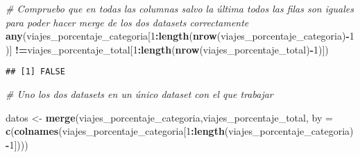 \documentclass[notspecified,article,submit,moreauthors,pdftex]{Definitions/mdpi}
\newenvironment{Shaded}{\begin{snugshade}}{\end{snugshade}}
\newcommand{\AttributeTok}[1]{\textcolor[rgb]{0.13,0.29,0.53}{#1}}
\newcommand{\CommentTok}[1]{\textcolor[rgb]{0.56,0.35,0.01}{\textit{#1}}}
\newcommand{\DecValTok}[1]{\textcolor[rgb]{0.00,0.00,0.81}{#1}}
\newcommand{\FunctionTok}[1]{\textcolor[rgb]{0.13,0.29,0.53}{\textbf{#1}}}
\newcommand{\NormalTok}[1]{#1}
\newcommand{\OtherTok}[1]{\textcolor[rgb]{0.56,0.35,0.01}{#1}}
\newcommand{\SpecialCharTok}[1]{\textcolor[rgb]{0.81,0.36,0.00}{\textbf{#1}}}
\begin{document}
\begin{Shaded}
\begin{Highlighting}[]
\CommentTok{\# Compruebo que en todas las columnas salvo la última todos las filas son iguales para poder hacer merge de los dos datasets correctamente}
\FunctionTok{any}\NormalTok{(viajes\_porcentaje\_categoria[}\DecValTok{1}\SpecialCharTok{:}\FunctionTok{length}\NormalTok{(}\FunctionTok{nrow}\NormalTok{(viajes\_porcentaje\_categoria)}\SpecialCharTok{{-}}\DecValTok{1}\NormalTok{)] }\SpecialCharTok{!=}\NormalTok{viajes\_porcentaje\_total[}\DecValTok{1}\SpecialCharTok{:}\FunctionTok{length}\NormalTok{(}\FunctionTok{nrow}\NormalTok{(viajes\_porcentaje\_total)}\SpecialCharTok{{-}}\DecValTok{1}\NormalTok{)])}
\end{Highlighting}
\end{Shaded}

\begin{verbatim}
## [1] FALSE
\end{verbatim}

\begin{Shaded}
\begin{Highlighting}[]
\CommentTok{\# Uno los dos datasets en un único dataset con el que trabajar}

\NormalTok{datos }\OtherTok{\textless{}{-}} \FunctionTok{merge}\NormalTok{(viajes\_porcentaje\_categoria,viajes\_porcentaje\_total, }\AttributeTok{by =} \FunctionTok{c}\NormalTok{(}\FunctionTok{colnames}\NormalTok{(viajes\_porcentaje\_categoria[}\DecValTok{1}\SpecialCharTok{:}\FunctionTok{length}\NormalTok{(viajes\_porcentaje\_categoria)}\SpecialCharTok{{-}}\DecValTok{1}\NormalTok{])))}
\end{Highlighting}
\end{Shaded}



\vspace{6pt}



\end{document}

